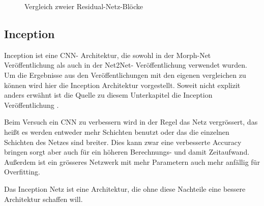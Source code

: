 \begin{figure}[h]
 \centering
 \qquad
       \caption{Vergleich zweier Residual-Netz-Blöcke \cite{resnet}}
\end{figure}

\subsection{Inception}
\color{blue1}
Inception ist eine CNN- Architektur, die sowohl in der Morph-Net Veröffentlichung als auch in der Net2Net- Veröffentlichung verwendet wurden. Um die Ergebnisse aus den Veröffentlichungen mit den eigenen vergleichen zu können wird hier die Inception Architektur vorgestellt. Soweit nicht explizit anders erwähnt ist die Quelle zu diesem Unterkapitel die Inception Veröffentlichung \cite{Inception}.


Beim Versuch ein CNN zu verbessern wird in der Regel das Netz vergrössert, das heißt es werden entweder mehr Schichten benutzt oder das die einzelnen Schichten des Netzes sind breiter. Dies kann zwar eine verbesserte Accuracy bringen sorgt aber auch für ein höheren Berechnungs- und damit Zeitaufwand. Außerdem ist ein grösseres Netzwerk mit mehr Parametern auch mehr anfällig für Overfitting.

Das Inception Netz ist eine Architektur, die ohne diese Nachteile eine bessere Architektur schaffen will.





